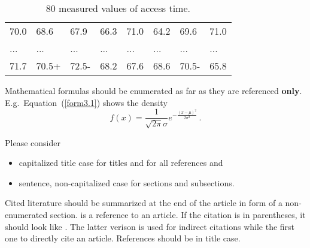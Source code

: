 \documentclass[article]{ajs}
\begin{document}
\begin{table}[hbt]
\caption{\label{Tab3.4}80 measured values of access time.}
\vspace*{-5mm}
\small
\hspace{1.5cm}
\begin{center}
\begin{tabular}{|llllllll|}
\toprule
70.0 & 68.6 & 67.9 & 66.3 & 71.0 & 64.2 & 69.6 & 71.0\\
... & ... & ... & ... & ... & ... & ... & ...\\
71.7 & 70.5+& 72.5-& 68.2 & 67.6 & 68.6 & 70.5-& 65.8\\
\bottomrule
\end{tabular}
\end{center}
\end{table}

Mathematical formulas should be enumerated as far as they are
referenced \textbf{only}. E.g.~Equation~(\ref{form3.1}) shows the density 
\begin{equation}\label{form3.1}
f(x) =
\frac1{\sqrt{2\pi}\sigma}e^{-\frac{(x-\mu)^2}{2\sigma^2}}\,.
\end{equation}

Please consider 

\begin{itemize}
\item  capitalized title case for titles and for all references and 
\item sentence, non-capitalized case for sections and subsections.
\end{itemize}


Cited literature should be summarized at the end of the article in
form of a non-enumerated section. \cite{knitr} is a reference
to an article. If the citation is in parentheses, it
should look like \citep{knitr}. The latter verison is used for indirect citations while the first one to directly cite an article.
References should be in title case.
\end{document}

